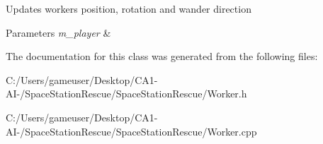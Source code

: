Updates workers position, rotation and wander direction 


\begin{DoxyParams}{Parameters}
{\em m\+\_\+player} & \\
\hline
\end{DoxyParams}


The documentation for this class was generated from the following files\+:\begin{DoxyCompactItemize}
\item 
C\+:/\+Users/gameuser/\+Desktop/\+C\+A1-\/\+A\+I-\//\+Space\+Station\+Rescue/\+Space\+Station\+Rescue/Worker.\+h\item 
C\+:/\+Users/gameuser/\+Desktop/\+C\+A1-\/\+A\+I-\//\+Space\+Station\+Rescue/\+Space\+Station\+Rescue/Worker.\+cpp\end{DoxyCompactItemize}
